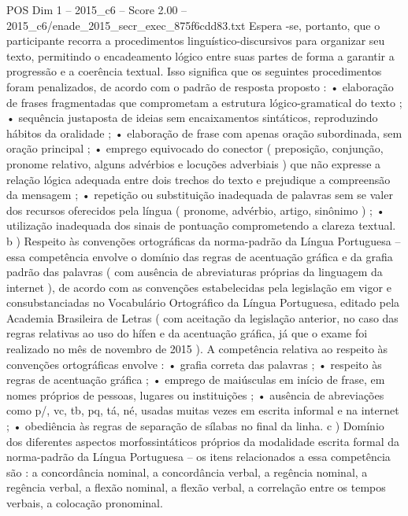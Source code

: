 \begin{textsample}{POS Dim 1 – 2015\_c6 – Score 2.00 – 2015\_c6/enade\_2015\_secr\_exec\_875f6cdd83.txt}
Espera -se, portanto, que o participante recorra a procedimentos linguístico-discursivos para organizar seu texto, permitindo o encadeamento lógico entre suas partes de forma a garantir a progressão e a coerência textual.
Isso significa que os seguintes procedimentos foram penalizados, de acordo com o padrão de resposta proposto : • elaboração de frases fragmentadas que comprometam a estrutura lógico-gramatical do texto ; • sequência justaposta de ideias sem encaixamentos sintáticos, reproduzindo hábitos da oralidade ; • elaboração de frase com apenas oração subordinada, sem oração principal ; • emprego equivocado do conector ( preposição, conjunção, pronome relativo, alguns advérbios e locuções adverbiais ) que não expresse a relação lógica adequada entre dois trechos do texto e prejudique a compreensão da mensagem ; • repetição ou substituição inadequada de palavras sem se valer dos recursos oferecidos pela língua ( pronome, advérbio, artigo, sinônimo ) ; • utilização inadequada dos sinais de pontuação comprometendo a clareza textual. b ) Respeito às convenções ortográficas da norma-padrão da Língua Portuguesa – essa competência envolve o domínio das regras de acentuação gráfica e da grafia padrão das palavras ( com ausência de abreviaturas próprias da linguagem da internet ), de acordo com as convenções estabelecidas pela legislação em vigor e consubstanciadas no Vocabulário Ortográfico da Língua Portuguesa, editado pela Academia Brasileira de Letras ( com aceitação da legislação anterior, no caso das regras relativas ao uso do hífen e da acentuação gráfica, já que o exame foi realizado no mês de novembro de 2015 ).
A competência relativa ao respeito às convenções ortográficas envolve : • grafia correta das palavras ; • respeito às regras de acentuação gráfica ; • emprego de maiúsculas em início de frase, em nomes próprios de pessoas, lugares ou instituições ; • ausência de abreviações como p/, vc, tb, pq, tá, né, usadas muitas vezes em escrita informal e na internet ; • obediência às regras de separação de sílabas no final da linha. c ) Domínio dos diferentes aspectos morfossintáticos próprios da modalidade escrita formal da norma-padrão da Língua Portuguesa – os itens relacionados a essa competência são : a concordância nominal, a concordância verbal, a regência nominal, a regência verbal, a flexão nominal, a flexão verbal, a correlação entre os tempos verbais, a colocação pronominal.

\end{textsample}
